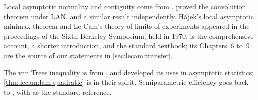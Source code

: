 \begin{refsection}
Local asymptotic normality and contiguity come from \textcite{LeCam1960}. \textcite{Hajek1970} proved the convolution theorem under LAN, and \textcite{Inagaki1970} a similar result independently. Hájek's local asymptotic minimax theorem \parencite{Hajek1972} and Le Cam's theory of limits of experiments \parencite{LeCam1972} appeared in the proceedings of the Sixth Berkeley Symposium, held in 1970. \textcite{LeCam1986} is the comprehensive account, \textcite{LeCamYang2000} a shorter introduction, and \textcite{vanderVaart1998} the standard textbook; its Chapters~6 to~9 are the source of our statements in \cref{sec:lecam:transfer}.

The van Trees inequality is from \textcite{vanTrees1968}, and \textcite{GillLevit1995} developed its uses in asymptotic statistics; \cref{thm:lecam:lam-quadratic} is in their spirit. Semiparametric efficiency goes back to \textcite{Stein1956}, with \textcite{BickelKlaassenRitovWellner1993} as the standard reference.

\printchapterbib
\end{refsection}
